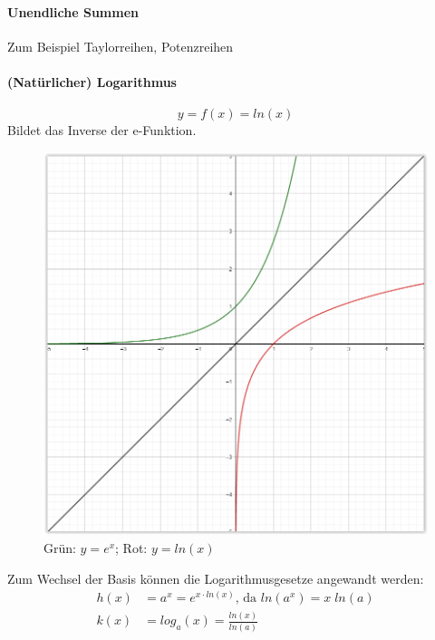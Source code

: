 \documentclass[12pt,a4paper]{report}%
\numberwithin{equation}{section}
\newcommand{\subsubsubsection}{\paragraph}
\numberwithin{equation}{subsection}
\begin{document}
		\subsubsubsection{Unendliche Summen}
		Zum Beispiel Taylorreihen, Potenzreihen
		
		\subsubsubsection{(Natürlicher) Logarithmus}
		\begin{equation}
		  y = f(x) = ln(x)
		\end{equation}
		Bildet das Inverse der e-Funktion. 
		\begin{figure}[H]
		  \centering
		  \includegraphics[width=0.35\linewidth]{funktionen_e_ln.png}
		  \caption{Grün: $y = e^x$; Rot: $y = ln(x)$}
		  \label{fig:funkt_e_ln}
		\end{figure}
		Zum Wechsel der Basis können die Logarithmusgesetze angewandt werden:
		\begin{align}
		  h(x) &= a^x = e^{x \cdot ln(x)} \text{, da } ln(a^x) = x\;ln(a) \nonumber \\
		  k(x) &= log_a(x) = \frac{ln(x)}{ln(a)}
		\end{align}
		
\end{document}
